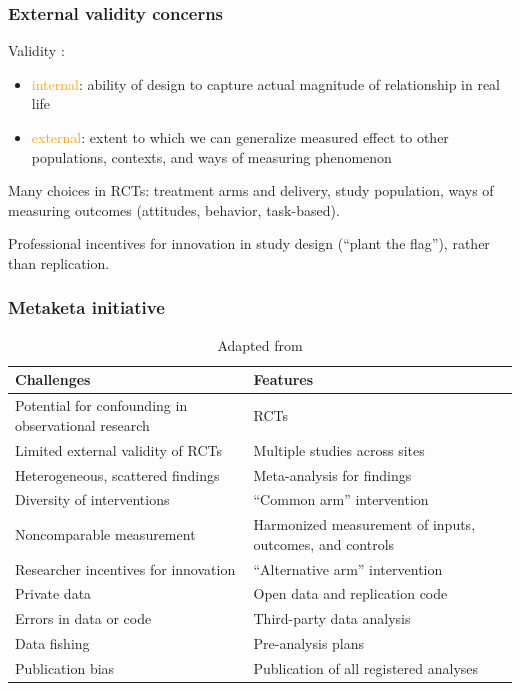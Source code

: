 \documentclass[12pt,english,dvipsnames,aspectratio=169,handout]{beamer}\usepackage[]{graphicx}\usepackage[]{xcolor}
\begin{document}
\begin{frame}
  \frametitle{External validity concerns}
  Validity \cite{campbell_experimental_1966}:
  
  \begin{itemize}
    \item \textcolor{orange}{internal}: ability of design to capture actual magnitude of relationship in real life \pause
    \item \textcolor{orange}{external}: extent to which we can generalize measured effect to other populations, contexts, and ways of measuring phenomenon
  \end{itemize}\bigskip
  \pause
  
  Many choices in RCTs: treatment arms and delivery, study population, ways of measuring outcomes (attitudes, behavior, task-based).\bigskip
  \pause
  
  Professional incentives for innovation in study design (``plant the flag''), rather than replication.
\end{frame}


\begin{frame}
	\frametitle{Metaketa initiative}
	
	\begin{table}
		\scriptsize
		\begin{tabular}{p{6cm} p{4.5cm}}
			\toprule
			\textbf{Challenges} & \textbf{Features} \\
			\midrule
			Potential for confounding in observational research & RCTs \\
			Limited external validity of RCTs & Multiple studies across sites \\
			Heterogeneous, scattered findings & Meta-analysis for findings \\
			Diversity of interventions & ``Common arm'' intervention \\
			Noncomparable measurement & Harmonized measurement of inputs, outcomes, and controls \\
			Researcher incentives for innovation & ``Alternative arm'' intervention \\
			Private data & Open data and replication code \\
			Errors in data or code & Third-party data analysis \\
			Data fishing & Pre-analysis plans \\
			Publication bias & Publication of all registered analyses \\
			\bottomrule
		\end{tabular}
	\caption{Adapted from }
	\end{table}
	
\end{frame}
\end{document}
